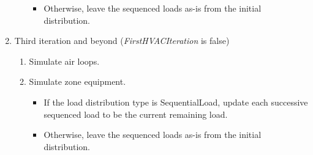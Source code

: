 \begin{enumerate}
\begin{enumerate}
\begin{itemize}
    \item
      Otherwise, leave the sequenced loads as-is from the initial distribution.
    \end{itemize}
  \end{enumerate}
\item
  Third iteration and beyond (\emph{FirstHVACIteration} is false)
  \begin{enumerate}
  \item
    Simulate air loops.
  \item
    Simulate zone equipment.
    \begin{itemize}
    \item
      If the load distribution type is SequentialLoad, update each successive sequenced load to be the current remaining load. 
    \item
      Otherwise, leave the sequenced loads as-is from the initial distribution.
    \end{itemize}
  \end{enumerate}
\end{enumerate}

